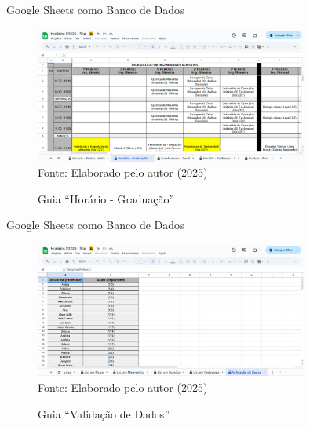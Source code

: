 \begin{frame}{Google Sheets como Banco de Dados}
    \begin{figure}
        \centering
        \vspace{-0.5cm}
        \caption{Guia ``Horário - Graduação''}
        \vspace{-0.2cm}
        \includegraphics[width=0.8\textwidth]{figuras/plan-2.png}
        \\ %
        \small Fonte: Elaborado pelo autor (2025)
    \end{figure}
\end{frame}

\begin{frame}{Google Sheets como Banco de Dados}
    \begin{figure}
        \centering
        \vspace{-0.5cm}
        \caption{Guia ``Validação de Dados''}
        \vspace{-0.2cm}
        \includegraphics[width=0.8\textwidth]{figuras/plan-3.png}
        \\ %
        \small Fonte: Elaborado pelo autor (2025)
    \end{figure}
\end{frame}


